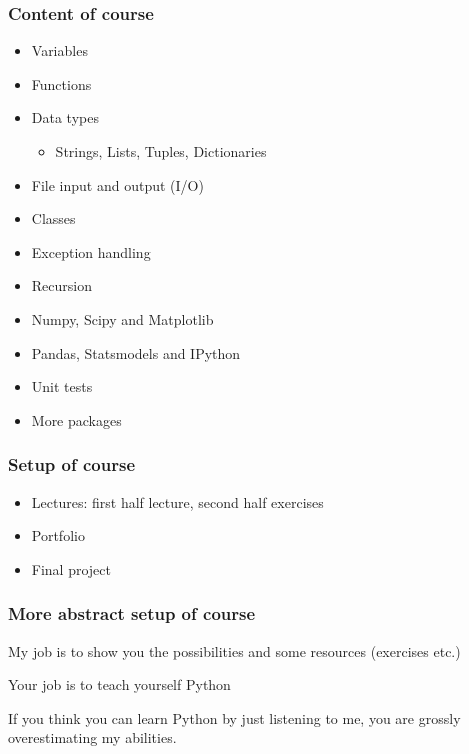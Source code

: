 \begin{frame}\frametitle{Content of course}
\begin{itemize}
    \item Variables
    \item Functions
    \item Data types
    \begin{itemize}
        \item Strings, Lists, Tuples, Dictionaries
    \end{itemize}
    \item File input and output (I/O)
    \item Classes
    \item Exception handling
    \item Recursion
    \item Numpy, Scipy and Matplotlib
    \item Pandas, Statsmodels and IPython
    \item Unit tests
    \item More packages
\end{itemize}

\end{frame}

\begin{frame}\frametitle{Setup of course}

\begin{itemize}
    \item Lectures: first half lecture, second half exercises
    \item Portfolio
    \item Final project
\end{itemize}

\end{frame}

\begin{frame}\frametitle{More abstract setup of course}

    My job is to show you the possibilities and some resources (exercises etc.)

    \vfill

    Your job is to teach yourself Python

    \vfill

    If you think you can learn Python by just listening to me,
    you are grossly overestimating my abilities.

\end{frame}

